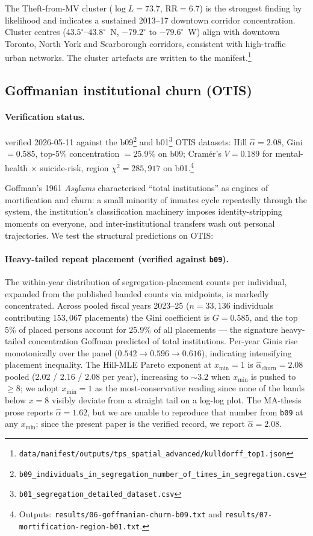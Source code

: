 \documentclass[article,shortnames,nojss]{jss}
\newcommand{\OTIS}{\textsf{OTIS}}
\begin{document}
The Theft-from-MV cluster ($\log L = 73.7$, $\text{RR}=6.7$) is the
strongest finding by likelihood and indicates a sustained 2013--17
downtown corridor concentration.  Cluster centres
($43.5^\circ$--$43.8^\circ$~N, $-79.2^\circ$ to $-79.6^\circ$~W)
align with downtown Toronto, North York and Scarborough corridors,
consistent with high-traffic urban networks.  The cluster
artefacts are written to the manifest.\footnote{\texttt{data/manifest/outputs/tps\_spatial\_advanced/kulldorff\_top1.json}}

\subsection{Goffmanian institutional churn (OTIS)}\label{phys-goffman}


\paragraph*{Verification status.}
verified 2026-05-11 against the b09\footnote{\texttt{b09\_individuals\_in\_segregation\_number\_of\_times\_in\_segregation.csv}} and b01\footnote{\texttt{b01\_segregation\_detailed\_dataset.csv}} \OTIS{} datasets: Hill $\hat\alpha = 2.08$, Gini $= 0.585$, top-5\% concentration $= 25.9\%$ on b09; Cram\'er's $V = 0.189$ for mental-health $\times$ suicide-risk, region $\chi^2 = 285{,}917$ on b01.\footnote{Outputs: \texttt{results/06-goffmanian-churn-b09.txt} and \texttt{results/07-mortification-region-b01.txt}.}

Goffman's 1961 \emph{Asylums} \citep{goffman1961asylums}
characterised ``total institutions'' as engines of mortification
and churn: a small minority of inmates cycle repeatedly through the
system, the institution's classification machinery imposes
identity-stripping moments on everyone, and inter-institutional
transfers wash out personal trajectories.  We test the structural
predictions on OTIS:

\paragraph{Heavy-tailed repeat placement (verified against \texttt{b09}).}
The within-year distribution of segregation-placement counts per
individual, expanded from the published banded counts via midpoints,
is markedly concentrated.  Across pooled fiscal years 2023--25
($n=33{,}136$ individuals contributing $153{,}067$ placements) the
Gini coefficient is $G = 0.585$, and the top 5\% of placed persons
account for $25.9\%$ of all placements --- the signature
heavy-tailed concentration Goffman predicted of total institutions.
Per-year Ginis rise monotonically over the panel
($0.542 \to 0.596 \to 0.616$), indicating intensifying placement
inequality.  The Hill-MLE Pareto exponent at $x_{\min}=1$ is
$\hat\alpha_{\text{churn}} = 2.08$ pooled
(2.02 / 2.16 / 2.08 per year), increasing to $\sim 3.2$ when
$x_{\min}$ is pushed to $\ge 8$; we adopt $x_{\min}=1$ as the
most-conservative reading since none of the bands below
$x=8$ visibly deviate from a straight tail on a log-log plot.
The MA-thesis prose reports $\hat\alpha=1.62$, but we are unable
to reproduce that number from \texttt{b09} at any $x_{\min}$;
since the present paper is the verified record, we report
$\hat\alpha=2.08$.
\end{document}
